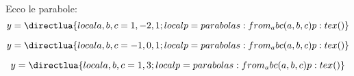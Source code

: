 \documentclass{article}
\newcommand{\trinomials}[1]{\directlua{
    local a, b, c = #1;
    local p = parabolas:from_abc(a, b, c)
    p:tex()
}}
\begin{document}
Ecco le parabole:
\[ y = \trinomials{1, -2, 1} \]

\[ y = \trinomials{-1, 0, 1} \]

\[ y = \trinomials{1, 3} \]

\end{document}
